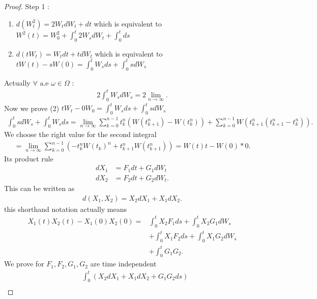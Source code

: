 \begin{definition}
  
\end{definition}
\begin{proof}
 Step 1 : 
 \begin{enumerate}
  \item $d(W_t^2) = 2 W_t dW_t + dt$ which is equivalent to $W^2(t) = W_0^{2} + \int_0^{t} 2 W_s dW_t + \int_0^{t} ds  $ 
  \item $d(tW_t) = W_t dt + t dW_t$ which is equivalent to $tW(t) - sW(0) = \int_0^{t} W_s ds + \int_0^{t} s dW_s  $
 \end{enumerate}
 Actually $\forall \text{ a.e } \omega  \in  \Omega $ : 
 \begin{align*}
   2 \int_0^{t} W_s dW_s = 2 \lim_{n \to \infty}  
 .\end{align*}
 Now we prove (2) $tW_t - 0 W_0  = \int_0^{t} W_s ds + \int_0^{t} s dW_s  $ 
 \begin{align*}
   \int_0^{t} s   dW_s + \int_0^{t} W_s ds = \lim_{n \to \infty} \sum_{k=0}^{n-1} t_k^{n} (W(t_{k+1}^{n} )- W(t_{k}^{n} ))    + \sum_{k=0}^{n-1} W(t_{k+1}^{n}(t_{k+1}^{n} -t_{k}^{n}  ) ) 
 .\end{align*}
 We choose the right value for the second integral
 \begin{align*}
   = \lim_{n\to \infty} \sum_{k=0}^{n-1} (-t_k^{n}W(t_k)^{n} + t_{k+1}^{n}W(t_{k+1}^{n} )   )   =W(t)t - W(0)*0
 .\end{align*}
 Its product rule 
 \begin{align*}
   dX_{1} &= F_{1} dt + G_{1}dW_t \\
   dX_2 &= F_{2} dt + G_{2} dW_t
 .\end{align*}
 This can be written as 
 \begin{align*}
  d(X_{1},X_{2}) = X_{2}dX_{1} + X_{1}dX_{2}
 .\end{align*}
 this shorthand notation actually means 
 \begin{align*}
   X_1(t)X_{2}(t) - X_{1}(0)X_{2}(0) = &\int_0^{t} X_{2}F_{1} ds + \int_0^{t} X_{2}G_{1} dW_s \\
                                       &+ \int_0^{t} X_{1}F_{2} ds + \int_0^{t} X_{1}G_{2}dW_s \\
                                       &+ \int_0^{t}G_{1}G_{2}     
 .\end{align*}
 We prove for $F_{1},F_{2},G_{1},G_{2}$ are time independent 
 \begin{align*}
   &\int_0^{t} (X_{2}dX_{1} + X_{1}dX_{2} + G_{1}G_{2}ds)  \\

\end{align*}
\end{proof}
